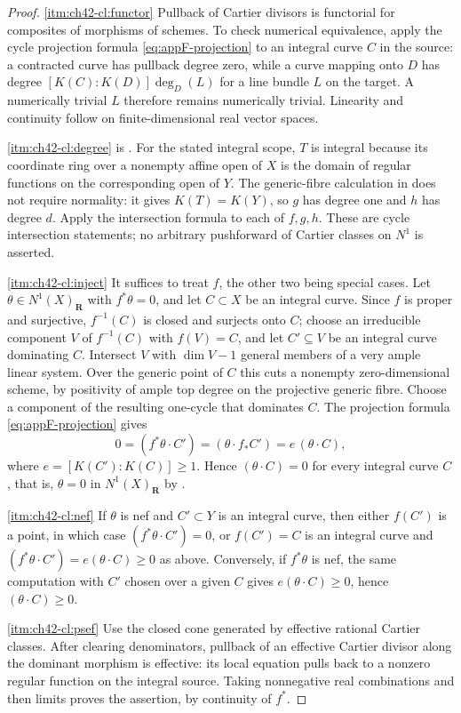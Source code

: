 \begin{proof}
\cref{itm:ch42-cl:functor}  Pullback of Cartier divisors is functorial for
composites of morphisms of schemes.  To check numerical equivalence,
apply the cycle projection formula \eqref{eq:appF-projection} to an
integral curve $C$ in the source: a contracted curve has pullback degree
zero, while a curve mapping onto $D$ has degree
$[K(C):K(D)]\deg_D(L)$ for a line bundle $L$ on the target.
A numerically trivial $L$ therefore remains numerically trivial.
Linearity and continuity follow on finite-dimensional real vector spaces.

\cref{itm:ch42-cl:degree} is .
For the stated integral scope, $T$ is integral because its coordinate
ring over a nonempty affine open of $X$ is the domain of regular
functions on the corresponding open of $Y$.
The generic-fibre calculation in 
does not require normality: it gives $K(T)=K(Y)$, so $g$ has
degree one and $h$ has degree $d$.  Apply the intersection formula
to each of $f,g,h$.  These are cycle intersection statements;
no arbitrary pushforward of Cartier classes on $N^1$ is asserted.

\cref{itm:ch42-cl:inject}  It suffices to treat $f$, the other two being
special cases.  Let $\theta\in N^1(X)_{\mathbf R}$ with $f^*\theta=0$,
and let $C\subset X$ be an integral curve.  Since $f$ is proper and
surjective, $f^{-1}(C)$ is closed and surjects onto $C$; choose an
irreducible component $V$ of $f^{-1}(C)$ with $f(V)=C$, and let
$C'\subseteq V$ be an integral curve dominating $C$.
Intersect $V$ with $\dim V-1$ general members of a very ample
linear system.  Over the generic point of $C$ this cuts a nonempty
zero-dimensional scheme, by positivity of ample top degree on the
projective generic fibre.  Choose a component of the resulting
one-cycle that dominates $C$.  The projection formula \eqref{eq:appF-projection} gives
\[
 0=(f^*\theta\cdot C')=(\theta\cdot f_*C')=e\,(\theta\cdot C),
\]
where $e=[K(C'):K(C)]\ge1$.  Hence $(\theta\cdot C)=0$ for every
integral curve $C$, that is, $\theta=0$ in $N^1(X)_{\mathbf R}$ by
.

\cref{itm:ch42-cl:nef}  If $\theta$ is nef and $C'\subset Y$ is an
integral curve, then either $f(C')$ is a point, in which case
$(f^*\theta\cdot C')=0$, or $f(C')=C$ is an integral curve and
$(f^*\theta\cdot C')=e(\theta\cdot C)\ge0$ as above.  Conversely, if
$f^*\theta$ is nef, the same computation with $C'$ chosen over a given
$C$ gives $e(\theta\cdot C)\ge0$, hence $(\theta\cdot C)\ge0$.

\cref{itm:ch42-cl:psef}  Use the closed cone generated by effective rational Cartier classes.
After clearing denominators, pullback of an effective Cartier divisor
along the dominant morphism is effective: its local equation pulls
back to a nonzero regular function on the integral source.
Taking nonnegative real combinations and then limits proves the
assertion, by continuity of $f^*$.
\end{proof}

